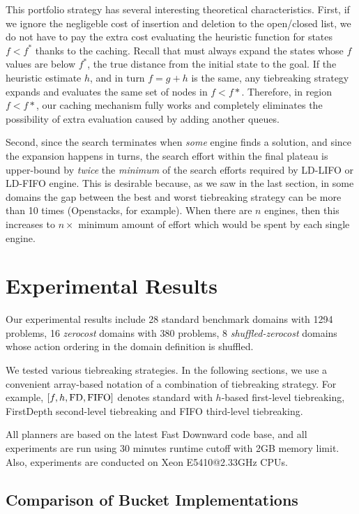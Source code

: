 This portfolio strategy has several interesting theoretical characteristics. First, if we ignore the negligeble cost of insertion and deletion to the open/closed list, we do not have to pay the extra cost evaluating the heuristic function for states $f<f^*$ thanks to the caching.
Recall that \astar must always expand the states whose $f$ values are below $f^*$, the true distance from the initial state to the goal. If the heuristic estimate $h$, and in turn $f=g+h$ is the same, any tiebreaking strategy expands and evaluates the same set of nodes in $f<f*$.
Therefore, in region $f<f*$, our caching mechanism fully works and completely eliminates the possibility of extra evaluation caused by adding another queues.

Second, since the search terminates when \emph{some} engine finds a solution, and since the expansion happens in turns, the search effort within the final plateau is upper-bound by \emph{twice} the \emph{minimum} of the search efforts required by LD-LIFO or LD-FIFO engine. This is desirable because, as we saw in the last section, in some domains the gap between the best and worst tiebreaking strategy can be more than 10 times (Openstacks, for example).
When there are $n$ engines, then this increases to $n\times$ minimum
amount of effort which would be spent by each single engine.

\section{Experimental Results}

Our experimental results include 28 standard benchmark domains with
1294 problems, 16 \emph{zerocost} domains with 380 problems, 8 \emph{shuffled-zerocost} 
domains whose action ordering in the domain definition is shuffled.

We tested various tiebreaking strategies. In the following sections, we
use a convenient array-based notation of a combination of tiebreaking
strategy.  For example, $[f,h,\mbox{FD},\mbox{FIFO}]$ denotes standard \astar with
$h$-based first-level tiebreaking, FirstDepth second-level tiebreaking and FIFO
third-level tiebreaking.

All planners are based on the latest Fast Downward code base, and all
experiments are run using 30 minutes runtime cutoff with 2GB memory
limit. Also, experiments are conducted on Xeon E5410@2.33GHz CPUs.

\subsection{Comparison of Bucket Implementations}

